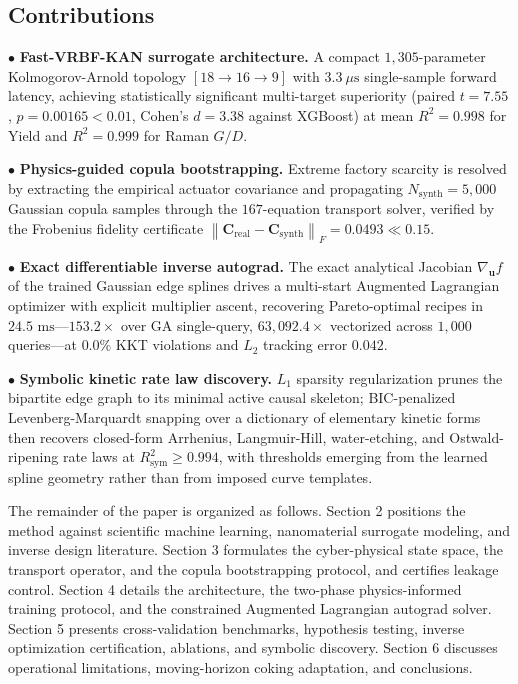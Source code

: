 \documentclass[10pt,journal,onecolumn]{IEEEtran}
\begin{document}
\subsection{Contributions}
\noindent $\bullet$ \textbf{Fast-VRBF-KAN surrogate architecture.} A compact $1,305$-parameter Kolmogorov-Arnold topology $[18 \to 16 \to 9]$ with $3.3\ \mu\text{s}$ single-sample forward latency, achieving statistically significant multi-target superiority (paired $t = 7.55$, $p = 0.00165 < 0.01$, Cohen's $d = 3.38$ against XGBoost) at mean $R^2 = 0.998$ for Yield and $R^2 = 0.999$ for Raman $G/D$.\par\smallskip
\noindent $\bullet$ \textbf{Physics-guided copula bootstrapping.} Extreme factory scarcity is resolved by extracting the empirical actuator covariance and propagating $N_{\text{synth}} = 5,000$ Gaussian copula samples through the $167$-equation transport solver, verified by the Frobenius fidelity certificate $\left\|\mathbf{C}_{\text{real}} - \mathbf{C}_{\text{synth}}\right\|_F = 0.0493 \ll 0.15$.\par\smallskip
\noindent $\bullet$ \textbf{Exact differentiable inverse autograd.} The exact analytical Jacobian $\nabla_{\mathbf{u}} f$ of the trained Gaussian edge splines drives a multi-start Augmented Lagrangian optimizer with explicit multiplier ascent, recovering Pareto-optimal recipes in $24.5\text{ ms}$—$153.2\times$ over GA single-query, $63,092.4\times$ vectorized across $1,000$ queries—at $0.0\%$ KKT violations and $L_2$ tracking error $0.042$.\par\smallskip
\noindent $\bullet$ \textbf{Symbolic kinetic rate law discovery.} $L_1$ sparsity regularization prunes the bipartite edge graph to its minimal active causal skeleton; BIC-penalized Levenberg-Marquardt snapping over a dictionary of elementary kinetic forms then recovers closed-form Arrhenius, Langmuir-Hill, water-etching, and Ostwald-ripening rate laws at $R^2_{\text{sym}} \ge 0.994$, with thresholds emerging from the learned spline geometry rather than from imposed curve templates.\par\smallskip
The remainder of the paper is organized as follows. Section 2 positions the method against scientific machine learning, nanomaterial surrogate modeling, and inverse design literature. Section 3 formulates the cyber-physical state space, the transport operator, and the copula bootstrapping protocol, and certifies leakage control. Section 4 details the architecture, the two-phase physics-informed training protocol, and the constrained Augmented Lagrangian autograd solver. Section 5 presents cross-validation benchmarks, hypothesis testing, inverse optimization certification, ablations, and symbolic discovery. Section 6 discusses operational limitations, moving-horizon coking adaptation, and conclusions.
\end{document}
